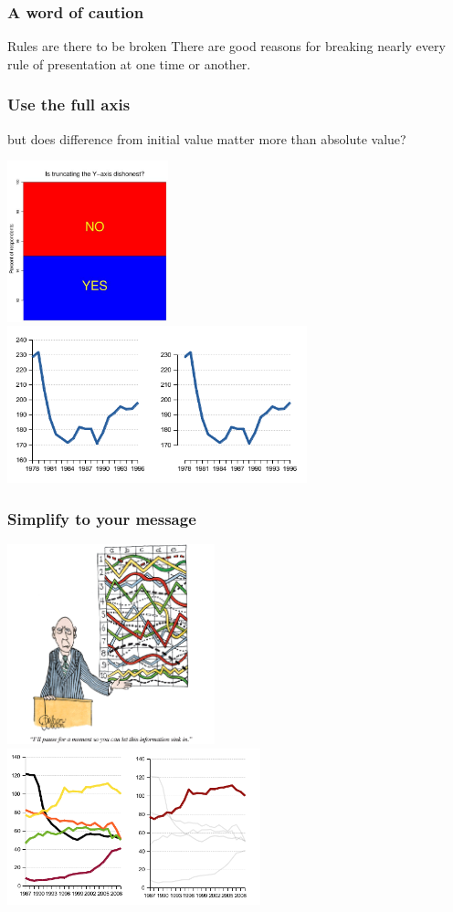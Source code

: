 
\begin{frame}
  \frametitle{A word of caution}
  \begin{alertblock}{Rules are there to be broken}
  There are good reasons for breaking nearly every rule of presentation at one time or another.
  \end{alertblock}
\end{frame}

\begin{frame}
  \frametitle{Use the full axis}
  \textcolor{hutton_blue}{but does difference from initial value matter more than absolute value?}
  \begin{center}
    \includegraphics[width=0.35\textwidth,valign=c]{images/truncated_y}
    \includegraphics[width=0.65\textwidth,valign=c]{images/non-connected-axes}    
  \end{center}
\end{frame}

\begin{frame}
  \frametitle{Simplify to your message}
  \begin{center}
    \includegraphics[width=0.45\textwidth,valign=t]{images/datavis_overcomplex}
    \includegraphics[width=0.55\textwidth,valign=t]{images/simplify}    
  \end{center}
\end{frame}